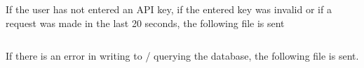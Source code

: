             \inputminted[frame=single, framesep=3mm, linenos=true, xleftmargin=2pt, tabsize=4, breaklines]{js}{../source/site/static/json/sample.json}
            \vspace{3mm}
            If the user has not entered an API key, if the entered key was invalid or if a request was made in the last 20 seconds, the following file is sent 
            
            \inputminted[frame=single, framesep=3mm, linenos=true, xleftmargin=2pt, tabsize=4, breaklines]{js}{../source/site/static/json/invalidGet.json}
            \vspace{3mm}
            If there is an error in writing to / querying the database, the following file is sent.
            \inputminted[frame=single, framesep=3mm, linenos=true, xleftmargin=2pt, tabsize=4, breaklines]{js}{../source/site/static/json/error.json}
